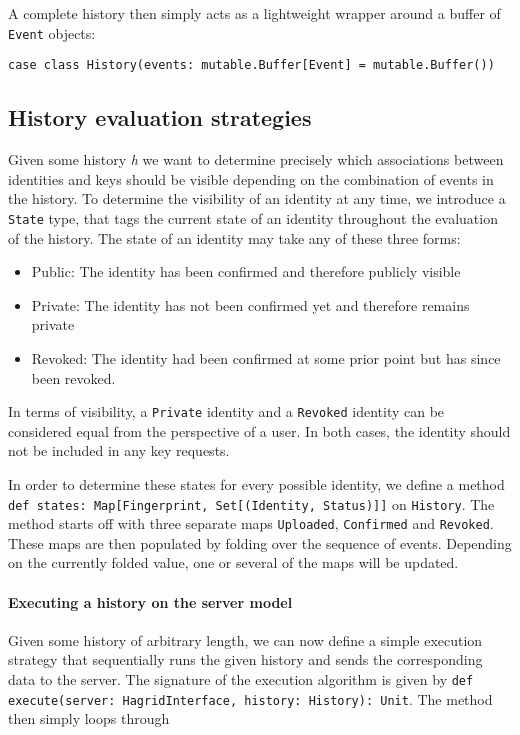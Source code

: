 A complete history then simply acts as a lightweight wrapper around a buffer of \texttt{Event} objects:
\begin{verbatim}
case class History(events: mutable.Buffer[Event] = mutable.Buffer())
\end{verbatim}

\subsection{History evaluation strategies}
Given some history \emph{h} we want to determine precisely which associations between identities and keys should be visible depending on the combination of events in the history.
To determine the visibility of an identity at any time, we introduce a \texttt{State} type, that tags the current state of an identity throughout the evaluation of the history.
The state of an identity may take any of these three forms: 
\begin{itemize}
    \item Public: The identity has been confirmed and therefore publicly visible
    \item Private: The identity has not been confirmed yet and therefore remains private
    \item Revoked: The identity had been confirmed at some prior point but has since been revoked.
\end{itemize}
In terms of visibility, a \texttt{Private} identity and a \texttt{Revoked} identity can be considered equal from the perspective of a user. In both cases, the identity should not be included in any key requests.

In order to determine these states for every possible identity, we define a method \texttt{def states: Map[Fingerprint, Set[(Identity, Status)]]} on \texttt{History}.
The method starts off with three separate maps \texttt{Uploaded}, \texttt{Confirmed} and \texttt{Revoked}. These maps are then populated by folding over the sequence of events.
Depending on the currently folded value, one or several of the maps will be updated. 

\paragraph{Executing a history on the server model}

Given some history of arbitrary length, we can now define a simple execution strategy that sequentially runs the given history and sends the corresponding data to the server.
The signature of the execution algorithm is given by \texttt{def execute(server: HagridInterface, history: History): Unit}. The method then simply loops through 


